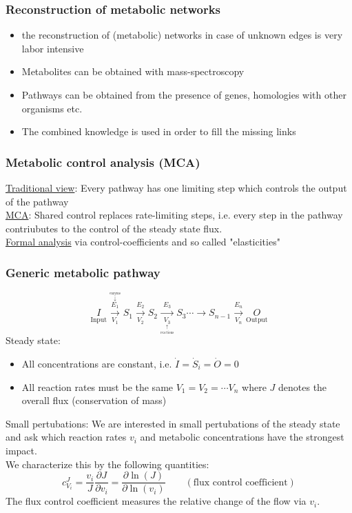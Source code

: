 \subsubsection{Reconstruction of metabolic networks}
\begin{itemize}[label={$\to$}]
\item the reconstruction of (metabolic) networks in case of unknown edges is very labor intensive
\item Metabolites can be obtained with mass-spectroscopy
\item Pathways can be obtained from the presence of genes, homologies with other organisms etc.
\item The combined knowledge is used in order to fill the missing links
\end{itemize}
\subsubsection{Metabolic control analysis (MCA)}
\underline{Traditional view}: Every pathway has one limiting step which controls the output of the pathway\\
\underline{MCA}: Shared control replaces rate-limiting steps, i.e. every step in the pathway contriubutes to the control of the steady state flux.\\
\underline{Formal analysis} via control-coefficients and so called "{}elasticities"{}
\subsubsection{Generic metabolic pathway}
\begin{equation*}
\underset{\text{Input}}{I}\underset{V_1}{\overset{\overset{\overset{\text{enzyms}}{\downarrow}}{E_1}}{\to}}S_1\underset{V_2}{\overset{E_2}{\to}}S_2\underset{\underset{\underset{\text{reactions}}{\uparrow}}{V_3}}{\overset{E_3}{\to}}S_3 \cdots \to S_{n-1}\underset{V_n}{\overset{E_n}{\to}}\underset{\text{Output}}{O}
\end{equation*}
Steady state:
\begin{itemize}[label={\textbullet}]
\item All concentrations are constant, i.e. $\dot{I}=\dot{S}_i=\dot{O}=0$
\item All reaction rates must be the same $V_1=V_2=\cdots V_n$ where $J$ denotes the overall flux (conservation of mass)
\end{itemize}
Small pertubations: We are interested in small pertubations of the steady state and ask which reaction rates $v_i$ and metabolic concentrations have the strongest impact.\\
We characterize this by the following quantities:
\begin{equation*}
c_{V_i}^J=\frac{v_i}{J}\frac{\partial J}{\partial v_i}=\frac{\partial\ln(J)}{\partial\ln(v_i)}\qquad (\text{flux control coefficient})
\end{equation*}
The flux control coefficient measures the relative change of the flow via $v_i$.
